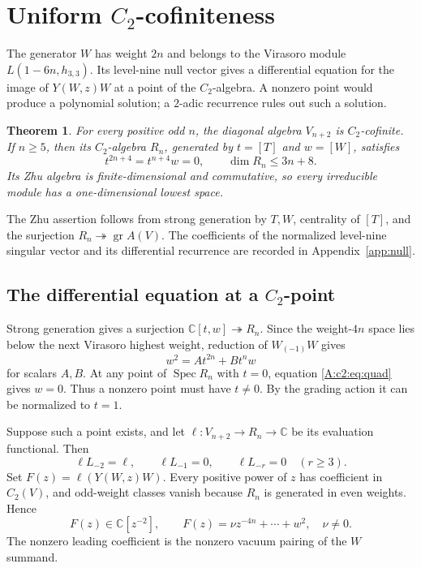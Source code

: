 \documentclass[11pt]{article}
\newtheorem{theorem}{Theorem}[section]
\newcommand{\C}{\mathbb C}\newcommand{\Q}{\mathbb Q}\newcommand{\Z}{\mathbb Z}
\newcommand{\Spec}{\operatorname{Spec}}\newcommand{\soc}{\operatorname{soc}}\newcommand{\ch}{\operatorname{ch}}
\numberwithin{equation}{section}
\begin{document}
\section{\texorpdfstring{Uniform $C_2$-cofiniteness}{Uniform C2-cofiniteness}}\label{A:app:c2}
The generator $W$ has weight $2n$ and belongs to the Virasoro module $L(1-6n,h_{3,3})$. Its level-nine null vector gives a differential equation for the image of $Y(W,z)W$ at a point of the $C_2$-algebra. A nonzero point would produce a polynomial solution; a $2$-adic recurrence rules out such a solution.

\begin{theorem}\label{A:c2:thm:main}
For every positive odd $n$, the diagonal algebra $V_{n+2}$ is $C_2$-cofinite. If $n\geq5$, then its $C_2$-algebra $R_n$, generated by $t=[T]$ and $w=[W]$, satisfies
\[
 t^{2n+4}=t^{n+4}w=0,\qquad \dim R_n\leq3n+8.
\]
Its Zhu algebra is finite-dimensional and commutative, so every irreducible module has a one-dimensional lowest space.
\end{theorem}

The Zhu assertion follows from strong generation by $T,W$, centrality of $[T]$, and the surjection $R_n\twoheadrightarrow\operatorname{gr}A(V)$. The coefficients of the normalized level-nine singular vector and its differential recurrence are recorded in Appendix~\ref{app:null}.

\subsection{The differential equation at a $C_2$-point}
Strong generation gives a surjection $\C[t,w]\twoheadrightarrow R_n$. Since the weight-$4n$ space lies below the next Virasoro highest weight, reduction of $W_{(-1)}W$ gives
\begin{equation}\label{A:c2:eq:quad}
 w^2=A t^{2n}+B t^n w
\end{equation}
for scalars $A,B$. At any point of $\Spec R_n$ with $t=0$, equation \eqref{A:c2:eq:quad} gives $w=0$. Thus a nonzero point must have $t\ne0$. By the grading action it can be normalized to $t=1$.

Suppose such a point exists, and let $\ell:V_{n+2}\to R_n\to\C$ be its evaluation functional. Then
\[
 \ell L_{-2}=\ell,\qquad \ell L_{-1}=0,\qquad
 \ell L_{-r}=0\quad(r\geq3).
\]
Set $F(z)=\ell(Y(W,z)W)$. Every positive power of $z$ has coefficient in $C_2(V)$, and odd-weight classes vanish because $R_n$ is generated in even weights. Hence
\begin{equation}\label{A:c2:eq:finite}
 F(z)\in\C[z^{-2}],\qquad
 F(z)=\nu z^{-4n}+\cdots+w^2,\quad \nu\ne0.
\end{equation}
The nonzero leading coefficient is the nonzero vacuum pairing of the $W$ summand.
\end{document}
